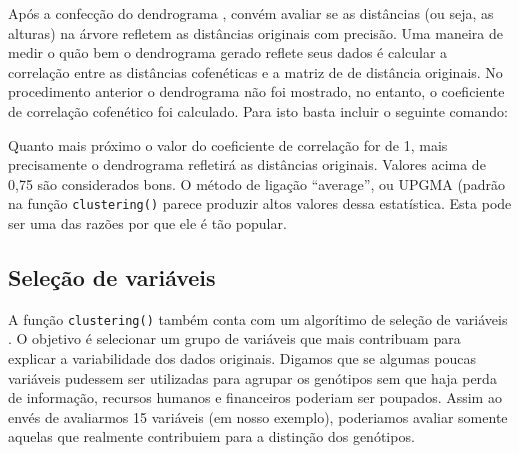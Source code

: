 \documentclass[
]{book}
\newenvironment{Shaded}{\begin{snugshade}}{\end{snugshade}}
\newcommand{\CommentTok}[1]{\textcolor[rgb]{0.56,0.35,0.01}{\textit{#1}}}
\newcommand{\NormalTok}[1]{#1}
\newcommand{\OperatorTok}[1]{\textcolor[rgb]{0.81,0.36,0.00}{\textbf{#1}}}
\begin{document}
Após a confecção do dendrograma , convém avaliar se as distâncias (ou seja, as alturas) na árvore refletem as distâncias originais com precisão. Uma maneira de medir o quão bem o dendrograma gerado reflete seus dados é calcular a correlação entre as distâncias cofenéticas e a matriz de de distância originais. No procedimento anterior o dendrograma não foi mostrado, no entanto, o coeficiente de correlação cofenético foi calculado. Para isto basta incluir o seguinte comando:

\begin{Shaded}
\end{Shaded}

Quanto mais próximo o valor do coeficiente de correlação for de 1, mais precisamente o dendrograma  refletirá as distâncias originais. Valores acima de 0,75 são considerados bons. O método de ligação ``average'', ou UPGMA (padrão na função \texttt{clustering()} parece produzir altos valores dessa estatística. Esta pode ser uma das razões por que ele é tão popular.

\hypertarget{seleuxe7uxe3o-de-variuxe1veis}{%
\subsection{Seleção de variáveis}\label{seleuxe7uxe3o-de-variuxe1veis}}

A função \texttt{clustering()}  também conta com um algorítimo de seleção de variáveis . O objetivo é selecionar um grupo de variáveis que mais contribuam para explicar a variabilidade dos dados originais. Digamos que se algumas poucas variáveis pudessem ser utilizadas para agrupar os genótipos sem que haja perda de informação, recursos humanos e financeiros poderiam ser poupados. Assim ao envés de avaliarmos 15 variáveis (em nosso exemplo), poderiamos avaliar somente aquelas que realmente contribuiem para a distinção dos genótipos.
\end{document}
